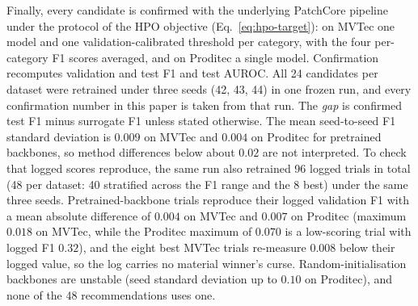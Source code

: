 \documentclass[final,5p,times,twocolumn]{elsarticle}
\begin{document}
Finally, every candidate is confirmed with the underlying PatchCore
pipeline under the protocol of the HPO objective
(Eq.~\ref{eq:hpo-target}): on MVTec one model and one
validation-calibrated threshold per category, with the four per-category F1 scores averaged, and on Proditec a single model.
Confirmation recomputes validation and test F1 and test AUROC. All 24
candidates per dataset were retrained under three seeds (42, 43, 44) in
one frozen run, and every confirmation number in this paper is taken from that run. The \emph{gap} is confirmed test F1 minus surrogate F1
unless stated otherwise. The mean seed-to-seed F1 standard deviation is
$0.009$ on MVTec and $0.004$ on Proditec for pretrained backbones, so
method differences below about $0.02$ are not interpreted.
To check that logged scores reproduce, the same run also retrained 96
logged trials in total (48 per dataset: 40 stratified across the F1
range and the 8 best) under the same three seeds. Pretrained-backbone
trials reproduce their logged validation F1 with a mean absolute
difference of $0.004$ on MVTec and $0.007$ on Proditec (maximum $0.018$ on MVTec, while the Proditec maximum of $0.070$ is a low-scoring trial with logged F1 $0.32$), and the eight best MVTec trials re-measure $0.008$ below
their logged value, so the log carries no material winner's curse.
Random-initialisation backbones are unstable (seed standard deviation up to $0.10$ on Proditec), and none of the 48 recommendations uses one.
\end{document}
